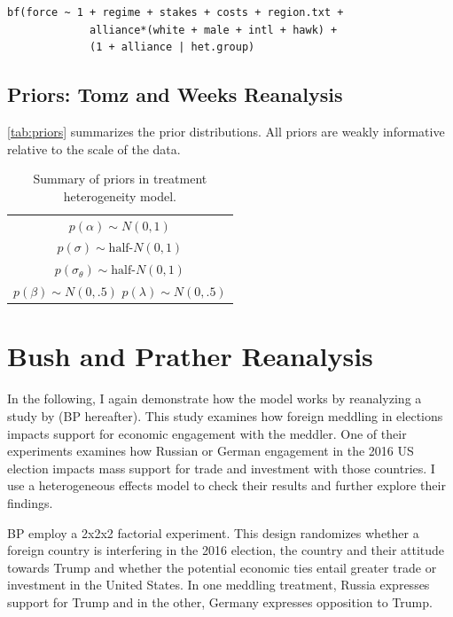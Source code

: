 \documentclass[12pt]{article}
\begin{document}
\begin{verbatim}
bf(force ~ 1 + regime + stakes + costs + region.txt +
             alliance*(white + male + intl + hawk) +
             (1 + alliance | het.group) 
\end{verbatim}


\subsection{Priors: Tomz and Weeks Reanalysis}


\autoref{tab:priors} summarizes the prior distributions. 
All priors are weakly informative relative to the scale of the data. 

\begin{table} %
\begin{center}
\begin{tabular}{c} 
$ p(\alpha) \sim N(0, 1)$  \\
$ p(\sigma) \sim \mbox{half-}N(0, 1) $ \\
$ p(\sigma_\theta) \sim \mbox{half-}N(0, 1) $ \\ 
$ p(\beta) \sim N(0, .5) $ 
$ p(\lambda) \sim N(0, .5) $ 
\end{tabular} 
\caption{Summary of priors in treatment heterogeneity model.} 
\label{tab:priors}
\end{center} 
\end{table} 

\newpage

\section{Bush and Prather Reanalysis}


In the following, I again demonstrate how the model works by reanalyzing a study by \citet{BushPrather2020} (BP hereafter). 
This study examines how foreign meddling in elections impacts support for economic engagement with the meddler. 
One of their experiments examines how Russian or German engagement in the 2016 US election impacts mass support for trade and investment with those countries.
I use a heterogeneous effects model to check their results and further explore their findings. 


BP employ a 2x2x2 factorial experiment.
This design randomizes whether a foreign country is interfering in the 2016 election, the country and their attitude towards Trump and whether the potential economic ties entail greater trade or investment in the United States.
In one meddling treatment, Russia expresses support for Trump and in the other, Germany expresses opposition to Trump. 
\end{document}

